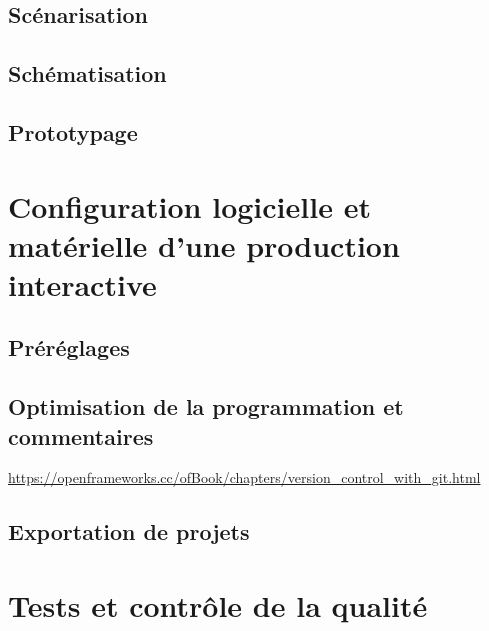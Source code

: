 \documentclass[
]{book}
\begin{document}
\hypertarget{scuxe9narisation}{%
\subsection{Scénarisation}\label{scuxe9narisation}}

\hypertarget{schuxe9matisation}{%
\subsection{Schématisation}\label{schuxe9matisation}}

\hypertarget{prototypage}{%
\subsection{Prototypage}\label{prototypage}}

\hypertarget{configuration-logicielle-et-matuxe9rielle-dune-production-interactive}{%
\section{Configuration logicielle et matérielle d'une production interactive}\label{configuration-logicielle-et-matuxe9rielle-dune-production-interactive}}

\hypertarget{pruxe9ruxe9glages}{%
\subsection{Préréglages}\label{pruxe9ruxe9glages}}

\hypertarget{optimisation-de-la-programmation-et-commentaires}{%
\subsection{Optimisation de la programmation et commentaires}\label{optimisation-de-la-programmation-et-commentaires}}

\url{https://openframeworks.cc/ofBook/chapters/version_control_with_git.html}

\hypertarget{exportation-de-projets}{%
\subsection{Exportation de projets}\label{exportation-de-projets}}

\hypertarget{tests-et-contruxf4le-de-la-qualituxe9}{%
\section{Tests et contrôle de la qualité}\label{tests-et-contruxf4le-de-la-qualituxe9}}
\end{document}
